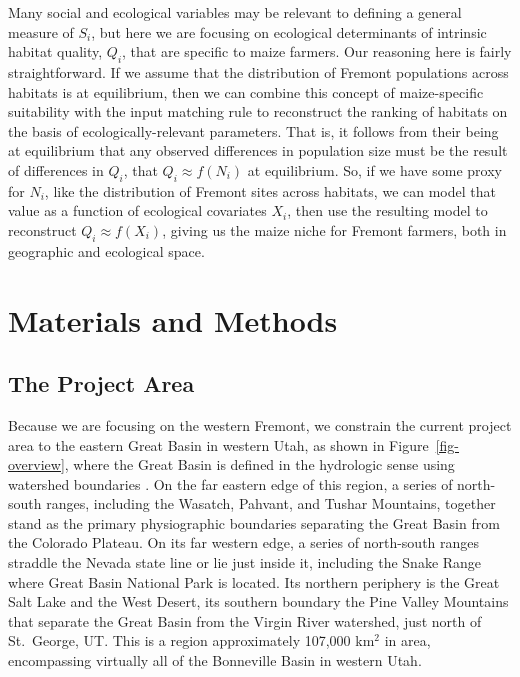 \documentclass[
  number,
  preprint,
  3p]{elsarticle}
\begin{document}
Many social and ecological variables may be relevant to defining a
general measure of \(S_i\), but here we are focusing on ecological
determinants of intrinsic habitat quality, \(Q_i\), that are specific to
maize farmers. Our reasoning here is fairly straightforward. If we
assume that the distribution of Fremont populations across habitats is
at equilibrium, then we can combine this concept of maize-specific
suitability with the input matching rule to reconstruct the ranking of
habitats on the basis of ecologically-relevant parameters. That is, it
follows from their being at equilibrium that any observed differences in
population size must be the result of differences in \(Q_i\), that
\(Q_i \approx f(N_i)\) at equilibrium. So, if we have some proxy for
\(N_i\), like the distribution of Fremont sites across habitats, we can
model that value as a function of ecological covariates \(X_i\), then
use the resulting model to reconstruct \(Q_i \approx f(X_i)\), giving us
the maize niche for Fremont farmers, both in geographic and ecological
space.

\hypertarget{materials-and-methods}{%
\section{Materials and Methods}\label{materials-and-methods}}

\hypertarget{the-project-area}{%
\subsection{The Project Area}\label{the-project-area}}

Because we are focusing on the western Fremont, we constrain the current
project area to the eastern Great Basin in western Utah, as shown in
Figure~\ref{fig-overview}, where the Great Basin is defined in the
hydrologic sense using watershed boundaries \citep{grayson2011}. On the
far eastern edge of this region, a series of north-south ranges,
including the Wasatch, Pahvant, and Tushar Mountains, together stand as
the primary physiographic boundaries separating the Great Basin from the
Colorado Plateau. On its far western edge, a series of north-south
ranges straddle the Nevada state line or lie just inside it, including
the Snake Range where Great Basin National Park is located. Its northern
periphery is the Great Salt Lake and the West Desert, its southern
boundary the Pine Valley Mountains that separate the Great Basin from
the Virgin River watershed, just north of St.~George, UT. This is a
region approximately 107,000 km\(^2\) in area, encompassing virtually
all of the Bonneville Basin in western Utah.
\end{document}
